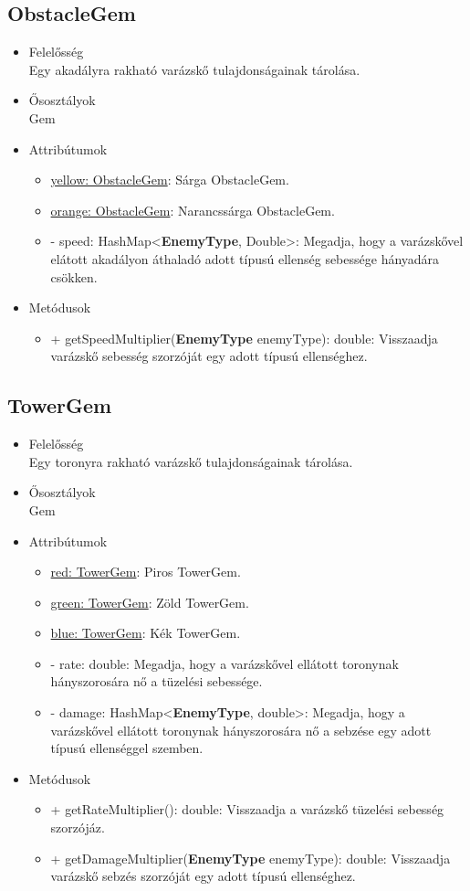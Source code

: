 \subsection{ObstacleGem}
\begin{itemize}
\item Felelősség\\
Egy akadályra rakható varázskő tulajdonságainak tárolása.
\item Ősosztályok\\
Gem
\item Attribútumok
	\begin{itemize}
		\item \underline{yellow: ObstacleGem}: Sárga ObstacleGem.
		\item \underline{orange: ObstacleGem}: Narancssárga ObstacleGem.
		\item - speed: HashMap<\textbf{EnemyType}, Double>: Megadja, hogy a varázskővel elátott akadályon áthaladó adott típusú ellenség sebessége hányadára csökken.
	\end{itemize}
\item Metódusok
	\begin{itemize}
		\item + getSpeedMultiplier(\textbf{EnemyType} enemyType): double: Visszaadja varázskő sebesség szorzóját egy adott típusú ellenséghez.
	\end{itemize}
\end{itemize}

\subsection{TowerGem}
\begin{itemize}
\item Felelősség\\
Egy toronyra rakható varázskő tulajdonságainak tárolása.
\item Ősosztályok\\
Gem
\item Attribútumok
	\begin{itemize}
		\item \underline{red: TowerGem}: Piros TowerGem.
		\item \underline{green: TowerGem}: Zöld TowerGem.
		\item \underline{blue: TowerGem}: Kék TowerGem.
		\item - rate: double: Megadja, hogy a varázskővel ellátott toronynak hányszorosára nő a tüzelési sebessége.
		\item - damage: HashMap<\textbf{EnemyType}, double>: Megadja, hogy a varázskővel ellátott toronynak hányszorosára nő a sebzése egy adott típusú ellenséggel szemben.
	\end{itemize}
\item Metódusok
	\begin{itemize}
		\item + getRateMultiplier(): double: Visszaadja a varázskő tüzelési sebesség szorzójáz.
		\item + getDamageMultiplier(\textbf{EnemyType} enemyType): double: Visszaadja varázskő sebzés szorzóját egy adott típusú ellenséghez.
	\end{itemize}
\end{itemize}

